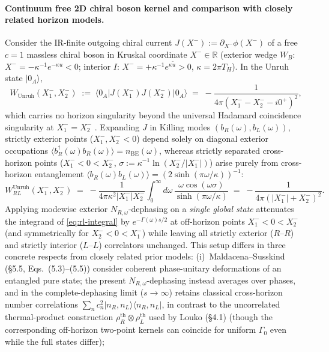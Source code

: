 \documentclass[11pt,a4paper]{article}
\theoremstyle{definition}
\theoremstyle{remark}
\newcommand{\bbR}{\mathbb{R}}
\newcommand{\1}{\mathbf{1}}
\begin{document}
\paragraph{Continuum free 2D chiral boson kernel and comparison with closely related horizon models.}
Consider the IR-finite outgoing chiral current $J(X^-) := \partial_{X^-}\phi(X^-)$ of a free $c=1$ massless chiral boson in Kruskal coordinate $X^-\in\bbR$ (exterior wedge $W_B$: $X^-=-\kappa^{-1}e^{-\kappa u}<0$; interior $I$: $X^-=+\kappa^{-1}e^{\kappa\tilde{u}}>0$, $\kappa=2\pi T_H$). In the Unruh state $|0_A\rangle$,
\begin{equation}\label{eq:unruh-current}
  W_{\mathrm{Unruh}}(X_1^-, X_2^-) \;:=\; \langle 0_A | J(X_1^-) J(X_2^-) | 0_A \rangle \;=\; -\frac{1}{4\pi(X_1^- - X_2^- - i0^+)^2},
\end{equation}
which carries no horizon singularity beyond the universal Hadamard coincidence singularity at $X_1^-=X_2^-$ \cite{KayWald1991,Sanders2015}. Expanding $J$ in Killing modes $(b_R(\omega), b_L(\omega))$, strictly exterior points ($X_1^-, X_2^- < 0$) depend solely on diagonal exterior occupations $\langle b_R^\dagger(\omega)b_R(\omega)\rangle = n_{\mathrm{BE}}(\omega)$, whereas strictly separated cross-horizon points ($X_1^- < 0 < X_2^-$, $\sigma := \kappa^{-1}\ln(X_2^-/|X_1^-|)$) arise purely from cross-horizon entanglement $\langle b_R(\omega)b_L(\omega)\rangle = (2\sinh(\pi\omega/\kappa))^{-1}$:
\begin{equation}\label{eq:rl-integral}
  W_{RL}^{\mathrm{Unruh}}(X_1^-, X_2^-) \;=\; -\frac{1}{4\pi \kappa^2 |X_1^-| X_2^-} \int_0^\infty d\omega\,\frac{\omega\cos(\omega\sigma)}{\sinh(\pi\omega/\kappa)} \;=\; -\frac{1}{4\pi(|X_1^-| + X_2^-)^2}.
\end{equation}
Applying modewise exterior $N_{R,\omega}$-dephasing on a \emph{single global state} attenuates the integrand of \eqref{eq:rl-integral} by $e^{-\Gamma(\omega)s/2}$ at off-horizon points $X_1^- < 0 < X_2^-$ (and symmetrically for $X_2^- < 0 < X_1^-$) while leaving all strictly exterior ($R$--$R$) and strictly interior ($L$--$L$) correlators unchanged. This setup differs in three concrete respects from closely related prior models:
(i)~Maldacena--Susskind \cite{MaldacenaSusskind2013} (\S5.5, Eqs.~(5.3)--(5.5)) consider coherent phase-unitary deformations of an entangled pure state; the present $N_{R,\omega}$-dephasing instead averages over phases, and in the complete-dephasing limit ($s\to\infty$) retains classical cross-horizon number correlations $\sum_n c_n^2|n_R,n_L\rangle\langle n_R,n_L|$, in contrast to the uncorrelated thermal-product construction $\rho_R^{\mathrm{th}}\otimes\rho_L^{\mathrm{th}}$ used by Louko \cite{Louko2014} (\S4.1) (though the corresponding off-horizon two-point kernels can coincide for uniform $\Gamma_0$ even while the full states differ);
\end{document}
